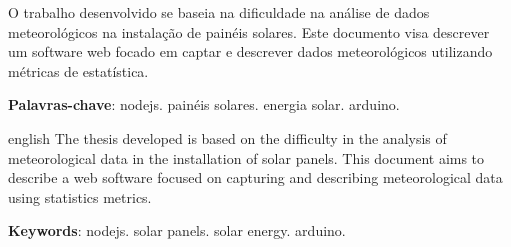 
\setlength{\absparsep}{18pt} %
\begin{resumo}
  O trabalho desenvolvido se baseia na dificuldade na análise de dados meteorológicos na instalação de painéis solares. Este documento visa descrever um software web focado em captar e descrever dados meteorológicos utilizando métricas de estatística.

 \textbf{Palavras-chave}: nodejs. painéis solares. energia solar. arduino.
\end{resumo}

\begin{resumo}[Abstract]
 \begin{otherlanguage*}{english}
  The thesis developed is based on the difficulty in the analysis of meteorological data in the installation of solar panels. This document aims to describe a web software focused on capturing and describing meteorological data using statistics metrics.

   \vspace{\onelineskip}

   \noindent
   \textbf{Keywords}: nodejs. solar panels. solar energy. arduino.
 \end{otherlanguage*}
\end{resumo}
